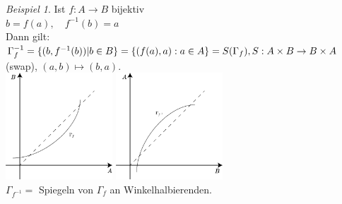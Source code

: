 \documentclass[12pt,a4paper,titlepage]{article} %
\theoremstyle{definition}
\theoremstyle{remark}
\newtheorem*{bsp}{Beispiel}
\begin{document}
\begin{bsp}
	Ist $f: A\rightarrow B$ bijektiv\\
	$b=f(a),\quad f^{-1}(b)=a$\\
	Dann gilt: $\Gamma_f^{-1} = \{(b, f^{-1}(b)) | b\in B\}\\
	= \{(f(a),a):a\in A\} = S(\Gamma_f), S: A\times B \rightarrow B\times A$ (swap), $(a,b)\mapsto(b,a)$.\\
	\includegraphics[width=0.3\textwidth]{images/img08.png} \quad
	\includegraphics[width=0.3\textwidth]{images/img09.png}\\
	$\Gamma_{f^{-1}} = $ Spiegeln von $\Gamma_f$ an Winkelhalbierenden.
\end{bsp}
\end{document}
